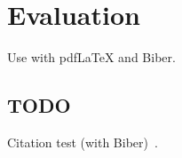 
\chapter{Evaluation}\label{chapter:evaluation}
Use with pdfLaTeX and Biber.

\section{TODO}
Citation test (with Biber)~\parencite{latex}.
